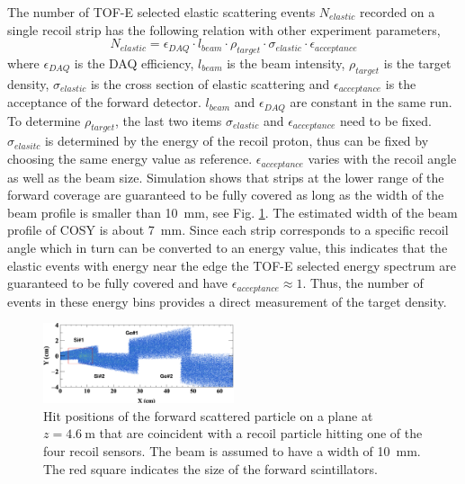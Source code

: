 \documentclass[fleqn,twocolumn,a4paper]{ikpar}
\begin{document}
\par
\medskip

The number of TOF-E selected elastic scattering events $N_{elastic}$ recorded on a single recoil strip has the
following relation with other experiment parameters,
\begin{equation}
  N_{elastic} = \epsilon_{DAQ}\cdot l_{beam}\cdot\rho_{target}\cdot\sigma_{elastic}\cdot\epsilon_{acceptance}
\end{equation}
where $\epsilon_{DAQ}$ is the DAQ efficiency, $l_{beam}$ is the beam intensity, $\rho_{target}$ is the target density,
$\sigma_{elastic}$ is the cross section of elastic scattering and
$\epsilon_{acceptance}$ is the acceptance of the forward detector.
$l_{beam}$ and $\epsilon_{DAQ}$ are constant in the same run.
To determine $\rho_{target}$, the last two items $\sigma_{elastic}$ and
$\epsilon_{acceptance}$ need to be fixed.
$\sigma_{elasitc}$ is determined by the energy of the recoil proton, thus can be
fixed by choosing the same energy value as reference.
$\epsilon_{acceptance}$ varies with the recoil angle as well as the beam size.
Simulation shows that strips at the lower range of the forward coverage are
guaranteed to be fully covered as long as the width of the beam profile is
smaller than \SI{10}{\mm}, see Fig. \ref{fig:fwd_acceptance}.
The estimated width of the beam profile of COSY is about \SI{7}{\mm}.
Since each strip corresponds to a specific recoil angle which in turn
can be converted to an energy value, this indicates that the elastic events with
energy near the edge the TOF-E selected energy spectrum are guaranteed to be
fully covered and have $\epsilon_{acceptance} \approx 1$.
Thus, the number of events in these energy bins provides a direct measurement of the target density.
\begin{figure}[htb!]
  \centering
	\includegraphics[width=0.5\textwidth]{./fwd_acceptance.png}
  \caption{
    Hit positions of the forward scattered particle on a plane at
    $z=\SI{4.6}{\m}$ that are coincident with a recoil particle hitting one of
    the four recoil sensors. The beam is assumed to have a width of \SI{10}{\mm}.
     The red square indicates the size of the forward scintillators.}
  \label{fig:fwd_acceptance}
\end{figure}
\end{document}
